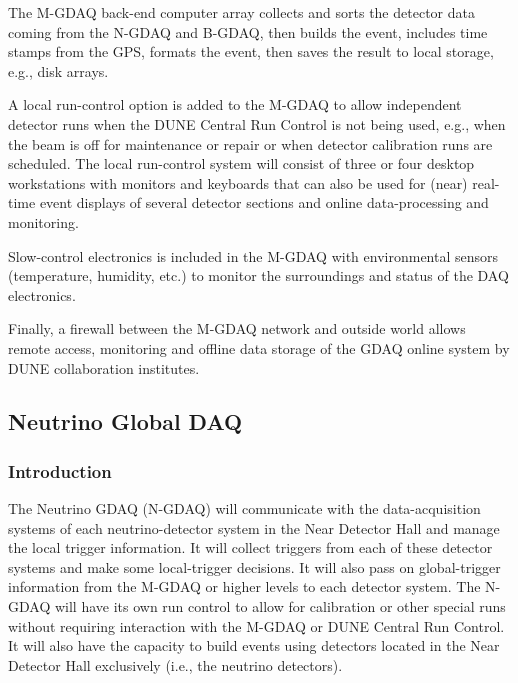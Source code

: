 The M-GDAQ back-end computer array collects and sorts the detector data 
coming from the N-GDAQ and B-GDAQ, then builds the event, includes 
time stamps from the GPS, formats the event, then %
saves the 
result to local storage, e.g., disk arrays.

A local run-control option is added to the M-GDAQ %
to allow independent 
detector runs when the DUNE Central Run Control is not being used, e.g.,  
when the beam is off for maintenance or repair or when detector 
calibration runs are scheduled. The local run-control system will consist of three or four 
desktop workstations with monitors and keyboards that can also be used 
for (near) real-time event displays of several detector sections and 
online data-processing and monitoring.

Slow-control electronics is included in the M-GDAQ  %
with environmental 
sensors (temperature, humidity, etc.) to monitor the surroundings and 
status of the DAQ electronics.

Finally, a firewall between the M-GDAQ  %
network and outside world allows 
remote access, monitoring and offline data storage of the GDAQ online 
system by DUNE collaboration institutes.

\subsection{Neutrino Global DAQ}
\label{subsec:N-GDAQ}

\subsubsection{Introduction} %

The Neutrino GDAQ (N-GDAQ) will communicate with the data-acquisition 
systems of each neutrino-detector system in the Near Detector Hall %
and manage the local trigger information. %
It will 
collect triggers from each of these detector systems and make some local-trigger 
decisions. It will also pass on global-trigger information from the %
M-GDAQ  %
or higher levels to each detector system. The N-GDAQ will have its 
own run control to allow for calibration or other special runs without 
requiring interaction with the %
M-GDAQ  %
or DUNE Central Run Control. It 
will also have the capacity to build events using detectors %
located in the Near Detector Hall exclusively (i.e., the neutrino detectors).

